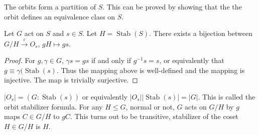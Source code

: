 \documentclass{article}
\newcommand{\eps}{\varepsilon}
\newcommand{\ra}[1][]{\xrightarrow{#1}}
\DeclareMathOperator{\Stab}{Stab}
\begin{document}
\begin{proposition}
The orbits form a partition of $S$. This can be proved by showing that the the orbit defines an equivalence class on $S$. 
\end{proposition}
\begin{proposition}
Let $G$ act on $S$ and $s\in S$. Let $H=\Stab(S)$. There exists a bijection between $G/H\ra[\eps]O_s$, $gH\mapsto gs$. 
\end{proposition}
\begin{proof}
For $g,\gamma\in G$, $\gamma s=gs$ if and only if $g^{-1}s=s$, or equivalently that $g\equiv \gamma (\Stab(s)$. Thus the mapping above is well-defined and the mapping is injective. The map is trivially surjective.
\end{proof}
\begin{corollary}
$|O_s|=(G:\Stab(s))$ or equivalently $|O_s||\Stab(s)|=|G|$. This is called the orbit stabilizer formula. For any $H\leq G$, normal or not, $G$ acts on $G/H$ by $g$ maps $C\in G/H$ to $gC$. This turns out to be transitive, stabilizer of the coset $H\in G/H$ is $H$. 
\end{corollary}
\end{document}

